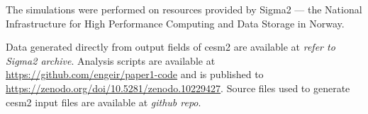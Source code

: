 \documentclass{ametsocV6.1}
\begin{document}
The simulations were performed on resources provided by Sigma2 --- the National
Infrastructure for High Performance Computing and Data Storage in Norway.

%
%
\datastatement{}

Data generated directly from output fields of \gls{cesm2} are available at \emph{refer
  to Sigma2 archive}. Analysis scripts are available at
\url{https://github.com/engeir/paper1-code} and is published to
\url{https://zenodo.org/doi/10.5281/zenodo.10229427}. Source files used to generate
\gls{cesm2} input files are available at \emph{github repo}.

%






%
\end{document}
